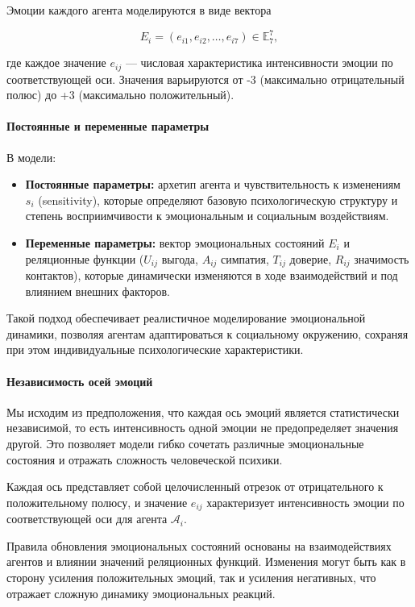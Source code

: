 \documentclass[12pt]{article}
\begin{document}
Эмоции каждого агента моделируются в виде вектора

%
\[
E_i = (e_{i1}, e_{i2}, \ldots, e_{i7}) \in\mathbb{E}_7^7,
\]

где каждое значение \( e_{ij} \) — числовая характеристика интенсивности эмоции по соответствующей оси. Значения варьируются от -3 (максимально отрицательный полюс) до +3 (максимально положительный).

\paragraph{Постоянные и переменные параметры}

В модели:

\begin{itemize}
    \item \textbf{Постоянные параметры:} архетип агента и чувствительность к изменениям  \( s_i \) (sensitivity), которые определяют базовую психологическую структуру и степень восприимчивости к эмоциональным и социальным воздействиям.
    \item \textbf{Переменные параметры:} вектор эмоциональных состояний \(E_i\) и реляционные функции (\(U_{ij}\) выгода, \(A_{ij}\) симпатия, \(T_{ij}\) доверие, \(R_{ij}\) значимость контактов), которые динамически изменяются в ходе взаимодействий и под влиянием внешних факторов.
\end{itemize}

Такой подход обеспечивает реалистичное моделирование эмоциональной динамики, позволяя агентам адаптироваться к социальному окружению, сохраняя при этом индивидуальные психологические характеристики.

\paragraph{Независимость осей эмоций}

Мы исходим из предположения, что каждая ось эмоций является статистически независимой, то есть интенсивность одной эмоции не предопределяет значения другой. Это позволяет модели гибко сочетать различные эмоциональные состояния и отражать сложность человеческой психики.

Каждая ось представляет собой целочисленный отрезок от отрицательного к положительному полюсу, и значение \( e_{ij} \) характеризует интенсивность эмоции по соответствующей оси для агента \( \mathcal{A}_i \).

Правила обновления эмоциональных состояний основаны на взаимодействиях агентов и влиянии значений реляционных функций. Изменения могут быть как в сторону усиления положительных эмоций, так и усиления негативных, что отражает сложную динамику эмоциональных реакций.
\end{document}
